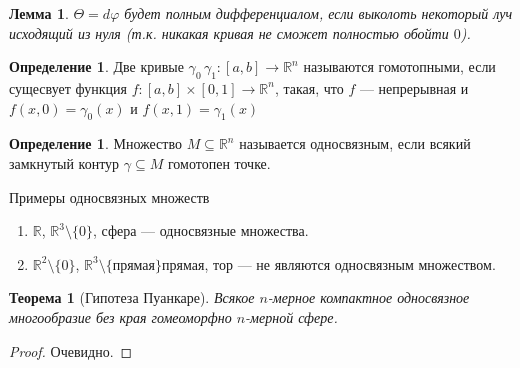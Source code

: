 \documentclass[a5paper]{article}
\newcounter{through}
\theoremstyle{plain}
\newtheorem{theorem}[through]{Теорема}
\newtheorem{lemma}[through]{Лемма}
\theoremstyle{definition}
\newtheorem{definition}[through]{Определение}
\numberwithin{through}{section}
\numberwithin{equation}{section}
\begin{document}
\begin{lemma}
	$\Theta = d \varphi$ будет полным дифференциалом, если выколоть некоторый луч исходящий из нуля (т.к. никакая кривая не сможет полностью обойти $0$).
\end{lemma}

\begin{definition}
	Две кривые $\gamma_0\, \gamma_1 : [a, b] \to \mathbb{R}^n$ называются гомотопными, если сущесвует функция $f : [a, b] \times [0, 1] \to \mathbb{R}^n$, такая, что $f$ --- непрерывная и $f(x, 0) = \gamma_0(x)$ и $f(x, 1) = \gamma_1(x)$
\end{definition}

\begin{definition}
	Множество $M \subseteq \mathbb{R}^n$ называется односвязным, если всякий замкнутый контур $\gamma \subseteq M$ гомотопен точке.
\end{definition}

Примеры односвязных множеств

\begin{enumerate}
	\item $\mathbb{R}$, $\mathbb{R}^3 \setminus \{0\}$, сфера --- односвязные множества.
	
	\item $\mathbb{R}^2 \setminus \{0\}$, $\mathbb{R}^3 \setminus \{\text{прямая}\} прямая$, тор --- не являются односвязным множеством.
\end{enumerate}

\begin{theorem}[Гипотеза Пуанкаре]
	Всякое $n$-мерное компактное односвязное многообразие без края гомеоморфно $n$-мерной сфере.
\end{theorem}

\begin{proof}
	Очевидно.
\end{proof}
\end{document}
